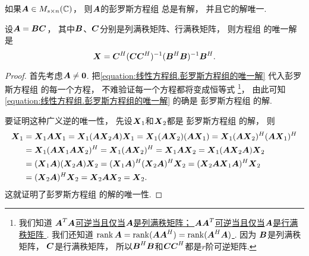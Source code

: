 \begin{theorem}[穆尔--彭罗斯广义逆的唯一性]\label{theorem:线性方程组.穆尔--彭罗斯广义逆的唯一性}
如果\(\boldsymbol{A} \in M_{s \times n}(\mathbb{C})\)，
则\(\boldsymbol{A}\)的彭罗斯方程组  总是有解，
并且它的解唯一.

设\(\boldsymbol{A} = \boldsymbol{B} \boldsymbol{C}\)，
其中\(\boldsymbol{B}\)、\(\boldsymbol{C}\)分别是列满秩矩阵、行满秩矩阵，
则方程组  的唯一解是
\begin{equation}\label{equation:线性方程组.彭罗斯方程组的唯一解}
	\boldsymbol{X} = \boldsymbol{C}^H (\boldsymbol{C} \boldsymbol{C}^H)^{-1} (\boldsymbol{B}^H \boldsymbol{B})^{-1} \boldsymbol{B}^H.
\end{equation}
\begin{proof}
首先考虑\(\boldsymbol{A}\neq\boldsymbol0\).
把\cref{equation:线性方程组.彭罗斯方程组的唯一解}
代入彭罗斯方程组  的每一个方程，
不难验证每一个方程都将变成恒等式
\footnote{
	我们知道 \hyperref[example:齐次线性方程组的解集的结构.矩阵及其转置的乘积可逆的充分必要条件]{
		\(\boldsymbol{A}^T \boldsymbol{A}\)可逆当且仅当\(\boldsymbol{A}\)是列满秩矩阵；
		\(\boldsymbol{A} \boldsymbol{A}^T\)可逆当且仅当\(\boldsymbol{A}\)是行满秩矩阵
	}.
	我们还知道 \hyperref[equation:矩阵乘积的秩.复矩阵及其共轭转置矩阵的乘积的秩]{
		\(
			\rank\boldsymbol{A}
			=\allowbreak
			\rank(\boldsymbol{A} \boldsymbol{A}^H)
			=\allowbreak
			\rank(\boldsymbol{A}^H \boldsymbol{A})
		\)
	}.
	因为
		\(\boldsymbol{B}\)是列满秩矩阵，
		\(\boldsymbol{C}\)是行满秩矩阵，
	所以\(\boldsymbol{B}^H \boldsymbol{B}\)和\(\boldsymbol{C} \boldsymbol{C}^H\)都是\(r\)阶可逆矩阵.
}，
由此可知\cref{equation:线性方程组.彭罗斯方程组的唯一解} 的确是
彭罗斯方程组  的解.

要证明这种广义逆的唯一性，
先设\(\boldsymbol{X}_1\)和\(\boldsymbol{X}_2\)都是
彭罗斯方程组  的解，
则\begin{align*}
	\boldsymbol{X}_1
	&= \boldsymbol{X}_1\boldsymbol{A} \boldsymbol{X}_1
	= \boldsymbol{X}_1(\boldsymbol{A} \boldsymbol{X}_2\boldsymbol{A})\boldsymbol{X}_1
	= \boldsymbol{X}_1(\boldsymbol{A} \boldsymbol{X}_2)(\boldsymbol{A} \boldsymbol{X}_1)
	= \boldsymbol{X}_1(\boldsymbol{A} \boldsymbol{X}_2)^H(\boldsymbol{A} \boldsymbol{X}_1)^H \\
	&= \boldsymbol{X}_1(\boldsymbol{A} \boldsymbol{X}_1\boldsymbol{A} \boldsymbol{X}_2)^H
	= \boldsymbol{X}_1(\boldsymbol{A} \boldsymbol{X}_2)^H
	= \boldsymbol{X}_1\boldsymbol{A} \boldsymbol{X}_2
	= \boldsymbol{X}_1(\boldsymbol{A} \boldsymbol{X}_2\boldsymbol{A})\boldsymbol{X}_2 \\
	&= (\boldsymbol{X}_1\boldsymbol{A})(\boldsymbol{X}_2\boldsymbol{A})\boldsymbol{X}_2
	= (\boldsymbol{X}_1\boldsymbol{A})^H(\boldsymbol{X}_2\boldsymbol{A})^H\boldsymbol{X}_2
	= (\boldsymbol{X}_2\boldsymbol{A} \boldsymbol{X}_1\boldsymbol{A})^H \boldsymbol{X}_2 \\
	&= (\boldsymbol{X}_2\boldsymbol{A})^H \boldsymbol{X}_2
	= \boldsymbol{X}_2\boldsymbol{A} \boldsymbol{X}_2
	= \boldsymbol{X}_2.
\end{align*}
这就证明了彭罗斯方程组  的解的唯一性.
\end{proof}
\end{theorem}
